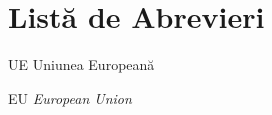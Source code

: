 \chapter*{Listă de Abrevieri}

\thispagestyle{front}

\begin{abbreviations}
    \color{gray}
    \item[UE] Uniunea Europeană
    \item[EU] \textit{European Union}
\end{abbreviations}

\newpage \